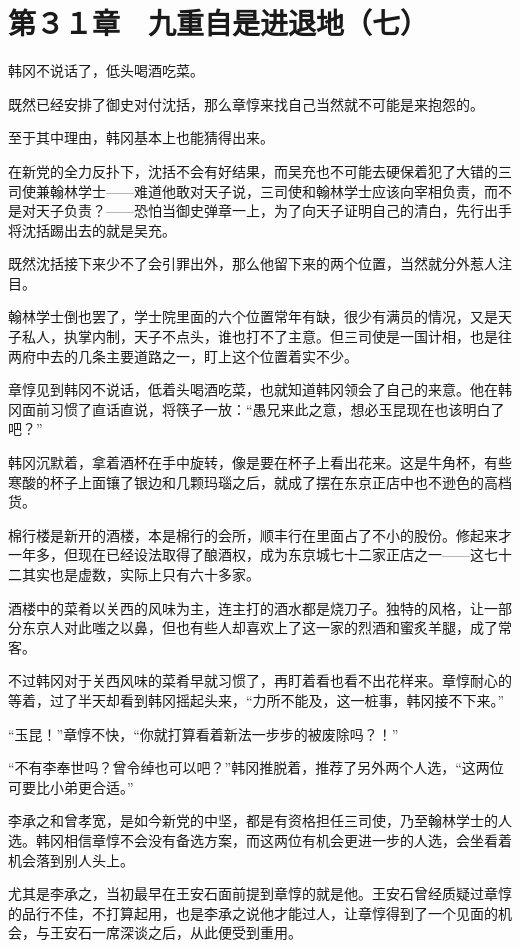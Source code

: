\section{第３１章　九重自是进退地（七）}

韩冈不说话了，低头喝酒吃菜。

既然已经安排了御史对付沈括，那么章惇来找自己当然就不可能是来抱怨的。

至于其中理由，韩冈基本上也能猜得出来。

在新党的全力反扑下，沈括不会有好结果，而吴充也不可能去硬保着犯了大错的三司使兼翰林学士——难道他敢对天子说，三司使和翰林学士应该向宰相负责，而不是对天子负责？——恐怕当御史弹章一上，为了向天子证明自己的清白，先行出手将沈括踢出去的就是吴充。

既然沈括接下来少不了会引罪出外，那么他留下来的两个位置，当然就分外惹人注目。

翰林学士倒也罢了，学士院里面的六个位置常年有缺，很少有满员的情况，又是天子私人，执掌内制，天子不点头，谁也打不了主意。但三司使是一国计相，也是往两府中去的几条主要道路之一，盯上这个位置着实不少。

章惇见到韩冈不说话，低着头喝酒吃菜，也就知道韩冈领会了自己的来意。他在韩冈面前习惯了直话直说，将筷子一放：“愚兄来此之意，想必玉昆现在也该明白了吧？”

韩冈沉默着，拿着酒杯在手中旋转，像是要在杯子上看出花来。这是牛角杯，有些寒酸的杯子上面镶了银边和几颗玛瑙之后，就成了摆在东京正店中也不逊色的高档货。

棉行楼是新开的酒楼，本是棉行的会所，顺丰行在里面占了不小的股份。修起来才一年多，但现在已经设法取得了酿酒权，成为东京城七十二家正店之一——这七十二其实也是虚数，实际上只有六十多家。

酒楼中的菜肴以关西的风味为主，连主打的酒水都是烧刀子。独特的风格，让一部分东京人对此嗤之以鼻，但也有些人却喜欢上了这一家的烈酒和蜜炙羊腿，成了常客。

不过韩冈对于关西风味的菜肴早就习惯了，再盯着看也看不出花样来。章惇耐心的等着，过了半天却看到韩冈摇起头来，“力所不能及，这一桩事，韩冈接不下来。”

“玉昆！”章惇不快，“你就打算看着新法一步步的被废除吗？！”

“不有李奉世吗？曾令绰也可以吧？”韩冈推脱着，推荐了另外两个人选，“这两位可要比小弟更合适。”

李承之和曾孝宽，是如今新党的中坚，都是有资格担任三司使，乃至翰林学士的人选。韩冈相信章惇不会没有备选方案，而这两位有机会更进一步的人选，会坐看着机会落到别人头上。

尤其是李承之，当初最早在王安石面前提到章惇的就是他。王安石曾经质疑过章惇的品行不佳，不打算起用，也是李承之说他才能过人，让章惇得到了一个见面的机会，与王安石一席深谈之后，从此便受到重用。

